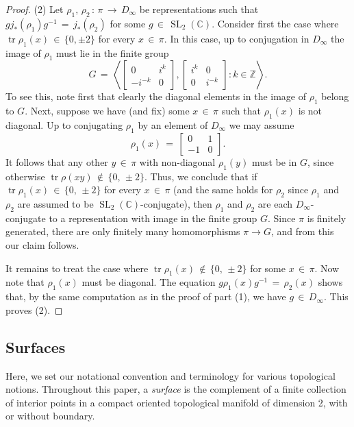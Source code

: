 \documentclass[reqno]{amsart}
\theoremstyle{plain}
\theoremstyle{definition}
\theoremstyle{remark}
\newcommand{\C}{{\mathbb{C}}}
\newcommand{\Z}{{\mathbb{Z}}}
\DeclareMathOperator{\SL}{SL}
\DeclareMathOperator{\tr}{tr}
\begin{document}
\begin{proof}
(2) Let $\rho_1,\,\rho_2\,:\,\pi\,\to\, D_\infty$ be representations such that 
$gj_*(\rho_1)g^{-1}\,=\,j_*(\rho_2)$ for some $g\,\in\,\SL_2(\C)$. Consider first the case where
$\tr\rho_1(x)\,\in\,\{0,\pm2\}$ for every $x\,\in\,\pi$. In this case, up to conjugation in $D_\infty$ the
image of $\rho_1$ must lie in the finite group
$$G\,=\,\left\langle\begin{bmatrix}
0 & i^k\\ -i^{-k} & 0
\end{bmatrix},\begin{bmatrix}
i^k & 0\\ 0 & {i^{-k}}
\end{bmatrix}:k\in\Z\right\rangle.$$
To see this, note first that clearly the diagonal elements in the image of $\rho_1$ belong to $G$. Next, suppose
we have (and fix) some $x\,\in\,\pi$ such that $\rho_1(x)$ is not diagonal. Up to conjugating $\rho_1$ by an
element of $D_\infty$ we may assume
$$\rho_1(x)\,=\,\begin{bmatrix}0 & 1\\ -1 & 0\end{bmatrix}.$$
It follows that any other $y\,\in\,\pi$ with non-diagonal $\rho_1(y)$ must be in $G$, since otherwise
$\tr\rho(xy)\,\notin\,\{0,\,\pm2\}$. Thus, we conclude that if $\tr\rho_1(x)\,\in\,\{0,\,\pm2\}$ for every
$x\,\in\,\pi$ (and the same holds for $\rho_2$ since $\rho_1$ and $\rho_2$ are assumed to be
$\SL_2(\C)$-conjugate), then $\rho_1$ and $\rho_2$ are each $D_\infty$-conjugate to a representation
with image in the finite group $G$. Since $\pi$ is finitely generated, there are
only finitely many homomorphisms $\pi\to G$, and from this our claim follows.

It remains to treat the case where $\tr\rho_1(x)\,\notin\,\{0,\,\pm2\}$ for some $x\,\in\,\pi$. Now note that
$\rho_1(x)$ must be diagonal. The equation 
$g\rho_1(x)g^{-1}\,=\,\rho_2(x)$ shows that, by the same computation as in the proof of part (1), we have $g\,\in\, 
D_\infty$. This proves (2).
\end{proof}

\subsection{Surfaces} \label{sect:2.3}

Here, we set our notational convention and terminology for various topological notions. Throughout this paper, 
a \emph{surface} is the complement of a finite collection of interior points in a compact oriented topological 
manifold of dimension 2, with or without boundary.
\end{document}
